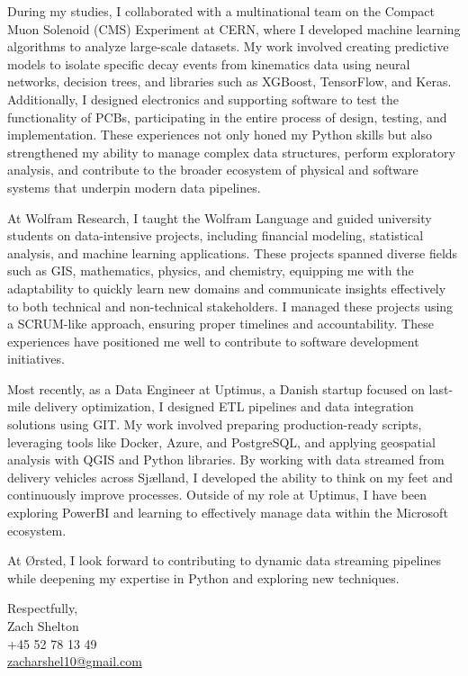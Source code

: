 \documentclass[11pt,a4]{article}
\begin{document}
During my studies, I collaborated with a multinational team on the Compact Muon Solenoid (CMS) Experiment at CERN, where I developed machine learning algorithms to analyze large-scale datasets. My work involved creating predictive models to isolate specific decay events from kinematics data using neural networks, decision trees, and libraries such as XGBoost, TensorFlow, and Keras. Additionally, I designed electronics and supporting software to test the functionality of PCBs, participating in the entire process of design, testing, and implementation. These experiences not only honed my Python skills but also strengthened my ability to manage complex data structures, perform exploratory analysis, and contribute to the broader ecosystem of physical and software systems that underpin modern data pipelines.

At Wolfram Research, I taught the Wolfram Language and guided university students on data-intensive projects, including financial modeling, statistical analysis, and machine learning applications. These projects spanned diverse fields such as GIS, mathematics, physics, and chemistry, equipping me with the adaptability to quickly learn new domains and communicate insights effectively to both technical and non-technical stakeholders. I managed these projects using a SCRUM-like approach, ensuring proper timelines and accountability. These experiences have positioned me well to contribute to software development initiatives.

Most recently, as a Data Engineer at Uptimus, a Danish startup focused on last-mile delivery optimization, I designed ETL pipelines and data integration solutions using GIT. My work involved preparing production-ready scripts, leveraging tools like Docker, Azure, and PostgreSQL, and applying geospatial analysis with QGIS and Python libraries. By working with data streamed from delivery vehicles across Sjælland, I developed the ability to think on my feet and continuously improve processes. Outside of my role at Uptimus, I have been exploring PowerBI and learning to effectively manage data within the Microsoft ecosystem.

At Ørsted, I look forward to contributing to dynamic data streaming pipelines while deepening my expertise in Python and exploring new techniques. 


\vspace{0.5cm}
\raggedright
Respectfully, \\ Zach Shelton 
\\ 
+45 52 78 13 49 \\ 
\href{mailto:zacharshel10@gmail.com}{zacharshel10@gmail.com} 
\end{document}
